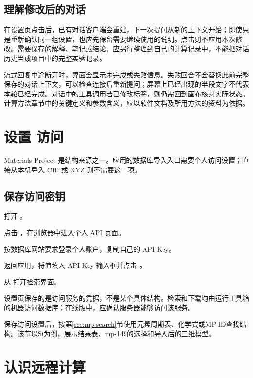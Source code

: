 \subsection{理解修改后的对话}

在设置页点击后，已有对话客户端会重建，下一次提问从新的上下文开始；即使只是重新确认同一组设置，也应先保留需要继续使用的说明。点击则不应用本次修改。需要保存的解释、笔记或结论，应另行整理到自己的计算记录中，不能把对话历史当成项目中的完整实验记录。

流式回复中途断开时，界面会显示未完成或失败信息。失败回合不会替换此前完整保存的对话上下文，可以检查连接后重新提问；屏幕上已经出现的半段文字不代表本轮已经完成。对话中的工具调用若已修改标签，则仍需回到画布核对实际状态。计算方法章节中的关键定义和参数含义，应以软件文档及所用方法的资料为依据。


\section{设置  访问}

Materials Project 是结构来源之一。应用的数据库导入入口需要个人访问设置；直接从本机导入 CIF 或 XYZ 则不需要这一项。

\subsection{保存访问密钥}

\begin{steps}
\item 打开 。
\item 点击 ，在浏览器中进入个人 API 页面。
\item 按数据库网站要求登录个人账户，复制自己的 API Key。
\item 返回应用，将值填入 API Key 输入框并点击 。
\item 从  打开检索界面。
\end{steps}

设置页保存的是访问服务的凭据，不是某个具体结构。检索和下载均由运行工具箱的机器访问数据库；在线版中，应确认服务器能够访问该服务。

保存访问设置后，按第\ref{sec:mp-search}节使用元素周期表、化学式或MP ID查找结构。该节以Si为例，展示结果表、mp-149的选择和导入后的三维模型。

\section{认识远程计算}

